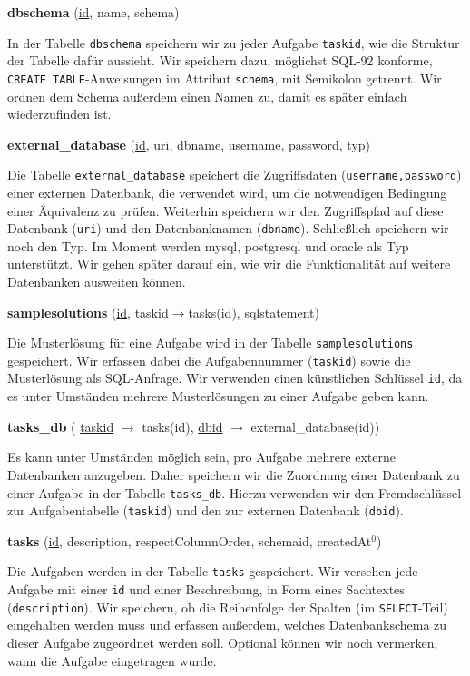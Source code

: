 \textbf{dbschema} (\underline{id}, name, schema)

In der Tabelle \verb|dbschema| speichern wir zu jeder Aufgabe \verb|taskid|, wie die Struktur der Tabelle dafür aussieht. Wir speichern dazu, möglichst SQL-92 konforme, \verb|CREATE TABLE|-Anweisungen im Attribut \verb|schema|, mit Semikolon getrennt. Wir ordnen dem Schema außerdem einen Namen zu, damit es später einfach wiederzufinden ist.

\textbf{external\_database} (\underline{id}, uri, dbname, username, password, typ)

Die Tabelle \verb|external_database| speichert die Zugriffsdaten (\verb|username,password|) einer externen Datenbank, die verwendet wird, um die notwendigen Bedingung einer Äquivalenz zu prüfen. Weiterhin speichern wir den Zugriffspfad auf diese Datenbank (\verb|uri|) und den Datenbanknamen (\verb|dbname|). Schließlich speichern wir noch den Typ. Im Moment werden mysql, postgresql und oracle als Typ unterstützt. Wir gehen später darauf ein, wie wir die Funktionalität auf weitere Datenbanken ausweiten können.

\textbf{samplesolutions} (\underline{id}, taskid$\to$tasks(id), sqlstatement)

Die Musterlösung für eine Aufgabe wird in der Tabelle \verb|samplesolutions| gespeichert. Wir erfassen dabei die Aufgabennummer (\verb|taskid|) sowie die Musterlösung als SQL-Anfrage. Wir verwenden einen künstlichen Schlüssel \verb|id|, da es unter Umständen mehrere Musterlösungen zu einer Aufgabe geben kann.

\textbf{tasks\_db} ( \underline{taskid} $\to$ tasks(id), \underline{dbid} $\to$ external\_database(id))

Es kann unter Umständen möglich sein, pro Aufgabe mehrere externe Datenbanken anzugeben. Daher speichern wir die Zuordnung einer Datenbank zu einer Aufgabe in der Tabelle \verb|tasks_db|. Hierzu verwenden wir den Fremdschlüssel zur Aufgabentabelle (\verb|taskid|) und den zur externen Datenbank (\verb|dbid|).

\textbf{tasks} (\underline{id}, description, respectColumnOrder, schemaid, createdAt$^0$)

Die Aufgaben werden in der Tabelle \verb|tasks| gespeichert. Wir versehen jede Aufgabe mit einer \verb|id| und einer Beschreibung, in Form eines Sachtextes (\verb|description|). Wir speichern, ob die Reihenfolge der Spalten (im \verb|SELECT|-Teil) eingehalten werden muss und erfassen außerdem, welches Datenbankschema zu dieser Aufgabe zugeordnet werden soll. Optional können wir noch vermerken, wann die Aufgabe eingetragen wurde.

